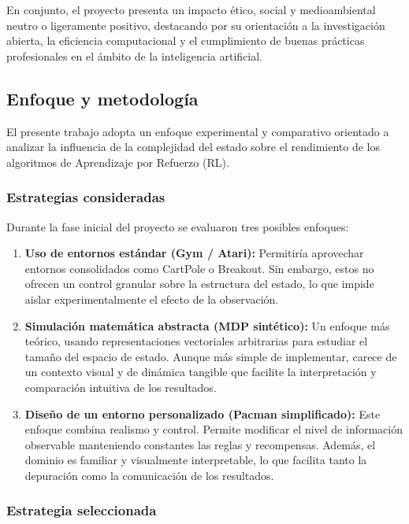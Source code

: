 \documentclass[12pt,a4paper,twoside,openany]{book}
\begin{document}
En conjunto, el proyecto presenta un impacto ético, social y medioambiental neutro o ligeramente positivo, destacando por su orientación a la investigación abierta, la eficiencia computacional y el cumplimiento de buenas prácticas profesionales en el ámbito de la inteligencia artificial.


\subsection{Enfoque y metodología}

El presente trabajo adopta un enfoque experimental y comparativo orientado a analizar la influencia de la complejidad del estado sobre el rendimiento de los algoritmos de Aprendizaje por Refuerzo (RL).

\subsubsection{Estrategias consideradas}

Durante la fase inicial del proyecto se evaluaron tres posibles enfoques:

\begin{enumerate}
	\item \textbf{Uso de entornos estándar (Gym / Atari):}
Permitiría aprovechar entornos consolidados como CartPole o Breakout. Sin embargo, estos no ofrecen un control granular sobre la estructura del estado, lo que impide aislar experimentalmente el efecto de la observación.
	\item \textbf{Simulación matemática abstracta (MDP sintético):}
Un enfoque más teórico, usando representaciones vectoriales arbitrarias para estudiar el tamaño del espacio de estado. Aunque más simple de implementar, carece de un contexto visual y de dinámica tangible que facilite la interpretación y comparación intuitiva de los resultados.
	\item \textbf{Diseño de un entorno personalizado (Pacman simplificado):}
Este enfoque combina realismo y control. Permite modificar el nivel de información observable manteniendo constantes las reglas y recompensas.
Además, el dominio es familiar y visualmente interpretable, lo que facilita tanto la depuración como la comunicación de los resultados.
\end{enumerate}

\subsubsection{Estrategia seleccionada}
\end{document}

